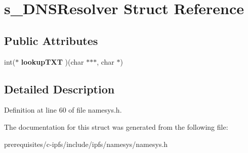 \hypertarget{structs___d_n_s_resolver}{}\section{s\+\_\+\+D\+N\+S\+Resolver Struct Reference}
\label{structs___d_n_s_resolver}
\subsection*{Public Attributes}
\begin{DoxyCompactItemize}
\item 
\mbox{\label{structs___d_n_s_resolver_af7ba91ecb17aed807e937d7fdca9e634}} 
int($\ast$ {\bfseries lookup\+T\+XT} )(char $\ast$$\ast$$\ast$, char $\ast$)
\end{DoxyCompactItemize}


\subsection{Detailed Description}


Definition at line 60 of file namesys.\+h.



The documentation for this struct was generated from the following file\+:\begin{DoxyCompactItemize}
\item 
prerequisites/c-\/ipfs/include/ipfs/namesys/namesys.\+h\end{DoxyCompactItemize}
